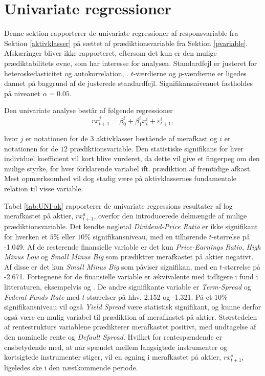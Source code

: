 \documentclass[
  a4paper,
  oneside]{memoir}
\begin{document}
\hypertarget{unireg}{%
\section{Univariate regressioner}\label{unireg}}

Denne sektion rapporterer de univariate regressioner af responsvariable fra Sektion \ref{aktivklasser} på sættet af prædiktionsvariable fra Sektion \ref{pvariable}. Afskæringer bliver ikke rapporteret, eftersom det kun er den mulige prædiktabilitets evne, som har interesse for analysen. Standardfejl er justeret for heteroskedasticitet og autokorrelation, \citep{Newey1987}. \(t\)-værdierne og \(p\)-værdierne er ligedes dannet på baggrund af de justerede standardfejl. Signifikansniveauet fastholdes på niveauet \(\alpha=0.05\).

Den univariate analyse består af følgende regressioner
\[rx_{t+1}^j=\beta_{0}^i+\beta_{1}^ix_{t}^i+\varepsilon_{t+1}^i,\]

hvor \(j\) er notationen for de \(3\) aktivklasser bestående af merafkast og \(i\) er notationen for de \(12\) prædiktionsvariable. Den statistiske signifikans for hver individuel koefficient vil kort blive vurderet, da dette vil give et fingerpeg om den mulige styrke, for hver forklarende variabel ift. prædiktion af fremtidige afkast. Mest opmærksomhed vil dog stadig være på aktivklassernes fundamentale relation til visse variable.

Tabel \ref{tab:UNI-ak} rapporterer de univariate regressions resultater af log merafkastet på aktier, \(rx_{t+1}^a\), overfor den introducerede delmængde af mulige prædiktionsvariable. Det kendte nøgletal \emph{Dividend-Price Ratio} er ikke signifikant for hverken et \(5\%\) eller \(10\%\) signifikansniveau, med en tilhørende \(t\)-størrelse på -1.049. Af de resterende finansielle variable er det kun \emph{Price-Earnings Ratio}, \emph{High Minus Low} og \emph{Small Minus Big} som prædiktrer merafkastet på aktier negativt. Af disse er det kun \emph{Small Minus Big} som påviser signifikan, med en \(t\)-størrelse på -2.671. Fortegnene for de finansielle variable er ækvivalente med tidligere i fund i litteraturen, eksempelvis \citep{Camp1987} og \citep{CampVicCha2003}. De andre signifikante variable er \emph{Term-Spread} og \emph{Federal Funds Rate} med \(t\)-størrelser på hhv. 2.152 og -1.321. På et \(10\%\) signifikansniveau vil også \emph{Yield Spread} være statistisk signifikant, og kunne derfor også være en mulig variabel til prædiktion af merafkastet på aktier. Størstedelen af rentestrukturs variablene prædikterer merafkastet positivt, med undtagelse af den nominelle rente og \emph{Default Spread}. Hvilket for rentespændende er ensbetydende med, at når spændet mellem langsigtede instrumenter og kortsigtede instrumenter stiger, vil en øgning i merafkastet på aktier, \(rx_{t+1}^s\), ligeledes ske i den næstkommende periode.
\end{document}

